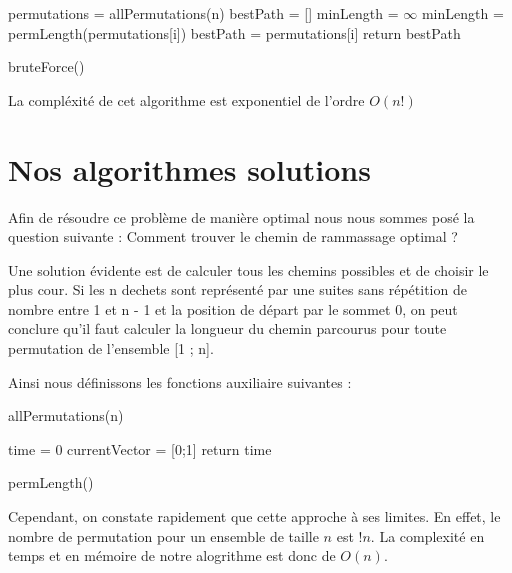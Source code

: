 \documentclass{report}
\begin{document}
  \begin{algorithm}[H]
    \SetAlgoLined
    permutations = allPermutations(n)\;
    bestPath = []\;
    minLength = $\infty$ \;
    {
        {
            minLength = permLength(permutations[i])\;
            bestPath = permutations[i]\;
        }
    }
    return bestPath\;
    \caption{bruteForce()}
  \end{algorithm}

  La compl\'exit\'e de cet algorithme est exponentiel de l'ordre $O(n!)$



\section{Nos algorithmes solutions}

Afin de résoudre ce problème de manière optimal nous nous sommes posé la question suivante : Comment trouver le chemin de rammassage optimal ?

Une solution évidente est de calculer tous les chemins possibles et de choisir le plus cour. Si les n dechets sont représenté par une suites sans répétition de nombre entre 1 et n - 1 et la position de départ par le sommet 0, on peut conclure qu'il faut calculer la longueur du chemin parcourus pour toute permutation de l'ensemble [1 ; n].

Ainsi nous définissons les fonctions auxiliaire suivantes : \\

\begin{algorithm}[H]
  \SetAlgoLined
  \caption{allPermutations(n)}
\end{algorithm}

\begin{algorithm}[H]
    \SetAlgoLined
    time = 0\;
    currentVector = [0;1]\;
    return time\;
    \caption{permLength()}
  \end{algorithm}


  Cependant, on constate rapidement que cette approche à ses limites. En effet, le nombre de permutation pour un ensemble de taille $n$ est $!n$. La complexité en temps et en mémoire de notre alogrithme est donc de $O(n)$.
\end{document}
